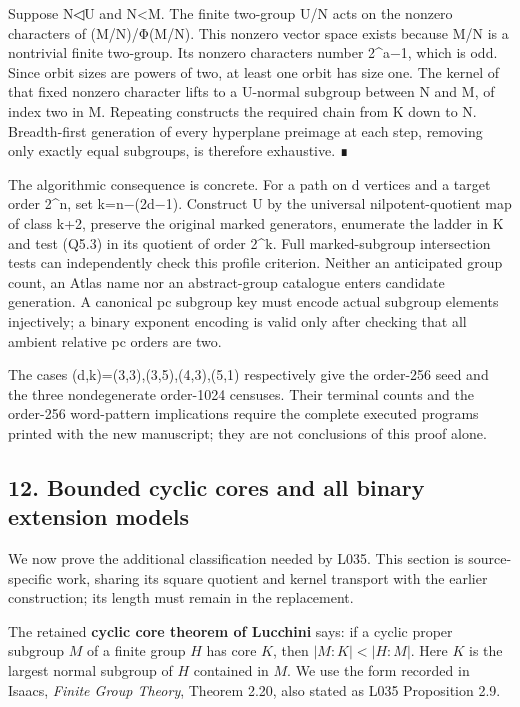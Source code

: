 \documentclass[
  10pt,
  letterpaper,
]{article}
\begin{document}
Suppose N◁U and N\textless M. The finite two-group U/N acts on the
nonzero characters of (M/N)/Φ(M/N). This nonzero vector space exists
because M/N is a nontrivial finite two-group. Its nonzero characters
number 2\^{}a−1, which is odd. Since orbit sizes are powers of two, at
least one orbit has size one. The kernel of that fixed nonzero character
lifts to a U-normal subgroup between N and M, of index two in M.
Repeating constructs the required chain from K down to N. Breadth-first
generation of every hyperplane preimage at each step, removing only
exactly equal subgroups, is therefore exhaustive. ∎

The algorithmic consequence is concrete. For a path on d vertices and a
target order 2\^{}n, set k=n−(2d−1). Construct U by the universal
nilpotent-quotient map of class k+2, preserve the original marked
generators, enumerate the ladder in K and test (Q5.3) in its quotient of
order 2\^{}k. Full marked-subgroup intersection tests can independently
check this profile criterion. Neither an anticipated group count, an
Atlas name nor an abstract-group catalogue enters candidate generation.
A canonical pc subgroup key must encode actual subgroup elements
injectively; a binary exponent encoding is valid only after checking
that all ambient relative pc orders are two.

The cases (d,k)=(3,3),(3,5),(4,3),(5,1) respectively give the order-256
seed and the three nondegenerate order-1024 censuses. Their terminal
counts and the order-256 word-pattern implications require the complete
executed programs printed with the new manuscript; they are not
conclusions of this proof alone.

\subsection{12. Bounded cyclic cores and all binary extension
models}\label{bounded-cyclic-cores-and-all-binary-extension-models}

We now prove the additional classification needed by L035. This section
is source-specific work, sharing its square quotient and kernel
transport with the earlier construction; its length must remain in the
replacement.

The retained \textbf{cyclic core theorem of Lucchini} says: if a cyclic
proper subgroup \(M\) of a finite group \(H\) has core \(K\), then
\(|M:K|<|H:M|\). Here \(K\) is the largest normal subgroup of \(H\)
contained in \(M\). We use the form recorded in Isaacs, \emph{Finite
Group Theory}, Theorem 2.20, also stated as L035 Proposition 2.9.
\end{document}
